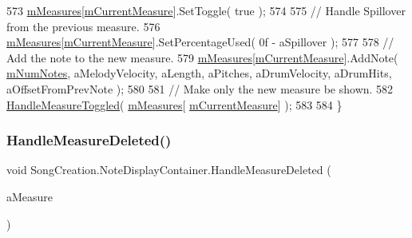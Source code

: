 \begin{DoxyCode}
573             \hyperlink{class_song_creation_1_1_note_display_container_a19c1c32db579c642fbc1b5bce0c80e7a}{mMeasures}[\hyperlink{class_song_creation_1_1_note_display_container_ad63614e1c51c2db44cfc0fc21704c4ff}{mCurrentMeasure}].SetToggle( \textcolor{keyword}{true} );
574 
575             \textcolor{comment}{// Handle Spillover from the previous measure.}
576             \hyperlink{class_song_creation_1_1_note_display_container_a19c1c32db579c642fbc1b5bce0c80e7a}{mMeasures}[\hyperlink{class_song_creation_1_1_note_display_container_ad63614e1c51c2db44cfc0fc21704c4ff}{mCurrentMeasure}].SetPercentageUsed( 0f - aSpillover );
577 
578             \textcolor{comment}{// Add the note to the new measure.}
579             \hyperlink{class_song_creation_1_1_note_display_container_a19c1c32db579c642fbc1b5bce0c80e7a}{mMeasures}[\hyperlink{class_song_creation_1_1_note_display_container_ad63614e1c51c2db44cfc0fc21704c4ff}{mCurrentMeasure}].AddNote( 
      \hyperlink{class_song_creation_1_1_note_display_container_a5ce614dc2b8f3d41f885639a92c97b1b}{mNumNotes}, aMelodyVelocity, aLength, aPitches, aDrumVelocity, aDrumHits, aOffsetFromPrevNote );
580 
581             \textcolor{comment}{// Make only the new measure be shown.}
582             \hyperlink{class_song_creation_1_1_note_display_container_af7f99e611828e62a31947a5a4d474465}{HandleMeasureToggled}( \hyperlink{class_song_creation_1_1_note_display_container_a19c1c32db579c642fbc1b5bce0c80e7a}{mMeasures}[
      \hyperlink{class_song_creation_1_1_note_display_container_ad63614e1c51c2db44cfc0fc21704c4ff}{mCurrentMeasure}] );
583 
584         \}
\end{DoxyCode}
\mbox{\label{class_song_creation_1_1_note_display_container_ae27c1c2674edd8a0918a561e082218d8}} 
\subsubsection{\texorpdfstring{Handle\+Measure\+Deleted()}{HandleMeasureDeleted()}}
{\footnotesize\ttfamily void Song\+Creation.\+Note\+Display\+Container.\+Handle\+Measure\+Deleted (\begin{DoxyParamCaption}\item[{\hyperlink{class_song_creation_1_1_measure_display_panel}{Measure\+Display\+Panel}}]{a\+Measure }\end{DoxyParamCaption})}



